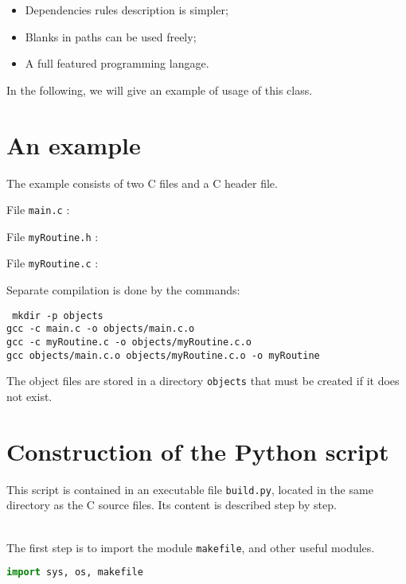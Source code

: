 \documentclass[a4paper,11pt]{extarticle}
\begin{document}
\begin{itemize}
  \item Dependencies rules description is simpler;
  \item Blanks in paths can be used freely;
  \item A full featured programming langage. 
\end{itemize}

In the following, we will give an example of usage of this class.

\section{An example}

The example consists of two C files and a C header file.

File \texttt{main.c} :



File \texttt{myRoutine.h} :



File \texttt{myRoutine.c} :


Separate compilation is done by the commands:

\begin{mdframed}[hidealllines=true,backgroundcolor=lightgray!20]
\tt\footnotesize
mkdir -p objects\\
gcc -c main.c -o objects/main.c.o\\
gcc -c myRoutine.c -o objects/myRoutine.c.o\\
gcc objects/main.c.o objects/myRoutine.c.o -o myRoutine
\end{mdframed}


The object files are stored in a directory \texttt{objects} that must be created if it does not exist.


\section{Construction of the Python script}

This script is contained in an executable file \texttt{build.py}, located in the same directory as the C source files. Its content is described step by step.

~\\The first step is to import the module \texttt{makefile}, and other useful modules.
\begin{lstlisting}[language=py]
import sys, os, makefile
\end{lstlisting}
\end{document}
